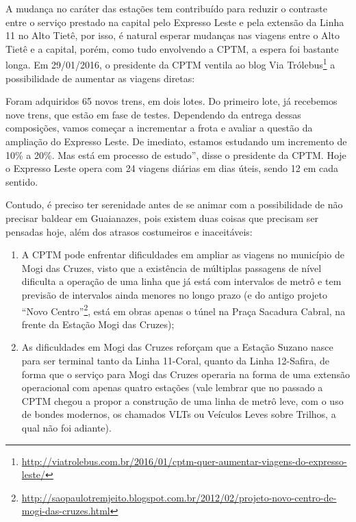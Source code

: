 \documentclass[11pt,fleqn]{book} %
\begin{document}
A mudança no caráter das estações tem contribuído para reduzir o contraste entre o serviço prestado na capital pelo Expresso Leste e pela extensão da Linha 11 no Alto Tietê, por isso, é natural esperar mudanças nas viagens entre o Alto Tietê e a capital, porém, como tudo envolvendo a CPTM, a espera foi bastante longa. Em 29/01/2016, o presidente da CPTM ventila ao blog Via Trólebus\footnote{\url{http://viatrolebus.com.br/2016/01/cptm-quer-aumentar-viagens-do-expresso-leste/}} a possibilidade de aumentar as viagens diretas:

\begin{citacao}
	Foram adquiridos 65 novos trens, em dois lotes. Do primeiro lote, já recebemos nove trens, que estão em fase de testes. Dependendo da entrega dessas composições, vamos começar a incrementar a frota e avaliar a questão da ampliação do Expresso Leste. De imediato, estamos estudando um incremento de 10\% a 20\%. Mas está em processo de estudo”, disse o presidente da CPTM. Hoje o Expresso Leste opera com 24 viagens diárias em dias úteis, sendo 12 em cada sentido.	
\end{citacao}

Contudo, é preciso ter serenidade antes de se animar com a possibilidade de não precisar baldear em Guaianazes, pois existem duas coisas que precisam ser pensadas hoje, além dos atrasos costumeiros e inaceitáveis:

\begin{enumerate}
	\item A CPTM pode enfrentar dificuldades em ampliar as viagens no município de Mogi das Cruzes, visto que a existência de múltiplas passagens de nível dificulta a operação de uma linha que já está com intervalos de metrô e tem previsão de intervalos ainda menores no longo prazo (e do antigo projeto “Novo Centro”\footnote{\url{http://saopaulotremjeito.blogspot.com.br/2012/02/projeto-novo-centro-de-mogi-das-cruzes.html}}, está em obras apenas o túnel na Praça Sacadura Cabral, na frente da Estação Mogi das Cruzes);
	\item As dificuldades em Mogi das Cruzes reforçam que a Estação Suzano nasce para ser terminal tanto da Linha 11-Coral, quanto da Linha 12-Safira, de forma que o serviço para Mogi das Cruzes operaria na forma de uma extensão operacional com apenas quatro estações (vale lembrar que no passado a CPTM chegou a propor a construção de uma linha de metrô leve, com o uso de bondes modernos, os chamados VLTs ou Veículos Leves sobre Trilhos, a qual não foi adiante).
\end{enumerate}
\end{document}

